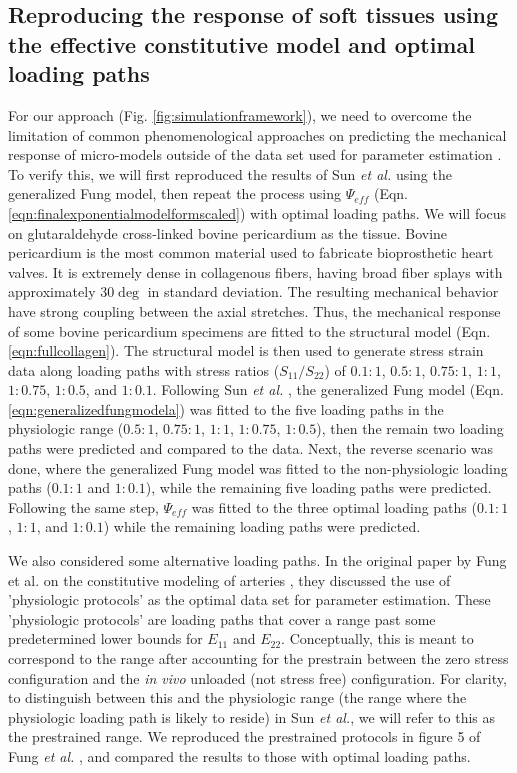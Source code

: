 \subsection{Reproducing the response of soft tissues using the effective constitutive model and optimal loading paths}\label{sec:reproducefung}

	For our approach (Fig. \ref{fig:simulationframework}), we need to overcome the limitation of common phenomenological approaches on predicting the mechanical response of micro-models outside of the data set used for parameter estimation \cite{sun_biaxial_2003}. To verify this, we will first reproduced the results of Sun \textit{et al.} \cite{sun_biaxial_2003} using the generalized Fung model, then repeat the process using $\Psi_{eff}$ (Eqn. \ref{eqn:finalexponentialmodelformscaled}) with optimal loading paths. We will focus on glutaraldehyde cross-linked bovine pericardium as the tissue. Bovine pericardium is the most common material used to fabricate bioprosthetic heart valves. It is extremely dense in collagenous fibers, having broad fiber splays with approximately $30\deg$ in standard deviation. The resulting mechanical behavior have strong coupling between the axial stretches. Thus, the mechanical response of some bovine pericardium specimens are fitted to the structural model (Eqn. \ref{eqn:fullcollagen}). The structural model is then used to generate stress strain data along loading paths with stress ratios ($S_{11}/S_{22}$) of $0.1:1$, $0.5:1$, $0.75:1$, $1:1$, $1:0.75$, $1:0.5$, and $1:0.1$. Following Sun \textit{et al.} \cite{sun_biaxial_2003}, the generalized Fung model (Eqn. \ref{eqn:generalizedfungmodela}) was fitted to the five loading paths in the physiologic range ($0.5:1$, $0.75:1$, $1:1$, $1:0.75$, $1:0.5$), then the remain two loading paths were predicted and compared to the data. Next, the reverse scenario was done, where the generalized Fung model was fitted to the non-physiologic loading paths ($0.1:1$ and $1:0.1$), while the remaining five loading paths were predicted. Following the same step, $\Psi_{eff}$ was fitted to the three optimal loading paths ($0.1:1$, $1:1$, and $1:0.1$) while the remaining loading paths were predicted. 
    
    We also considered some alternative loading paths. In the original paper by Fung et al. on the constitutive modeling of arteries \cite{fung_pseudoelasticity_1979}, they discussed the use of 'physiologic protocols' as the optimal data set for parameter estimation. These 'physiologic protocols' are loading paths that cover a range past some predetermined lower bounds for $E_{11}$ and $E_{22}$. Conceptually, this is meant to correspond to the range after accounting for the prestrain between the zero stress configuration and the \textit{in vivo} unloaded (not stress free) configuration. For clarity, to distinguish between this and the physiologic range (the range where the physiologic loading path is likely to reside) in Sun \textit{et al.}, we will refer to this as the prestrained range. We reproduced the prestrained protocols in figure 5 of Fung \textit{et al.} \cite{fung_pseudoelasticity_1979}, and compared the results to those with optimal loading paths. 





